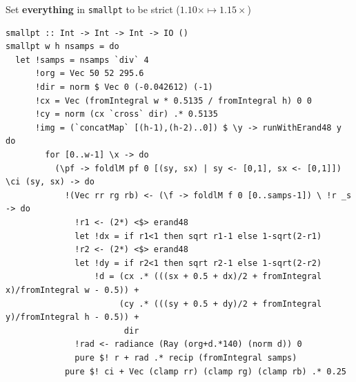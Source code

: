 \documentclass[8pt]{beamer}
\begin{document}
\begin{frame}[fragile]{Set \textbf{everything} in \texttt{smallpt} to be strict ($1.10\times \mapsto  1.15\times$)}
\begin{verbatim}
smallpt :: Int -> Int -> Int -> IO ()
smallpt w h nsamps = do
  let !samps = nsamps `div` 4
      !org = Vec 50 52 295.6
      !dir = norm $ Vec 0 (-0.042612) (-1)
      !cx = Vec (fromIntegral w * 0.5135 / fromIntegral h) 0 0
      !cy = norm (cx `cross` dir) .* 0.5135
      !img = (`concatMap` [(h-1),(h-2)..0]) $ \y -> runWithErand48 y do
        for [0..w-1] \x -> do
          (\pf -> foldlM pf 0 [(sy, sx) | sy <- [0,1], sx <- [0,1]]) \ci (sy, sx) -> do
            !(Vec rr rg rb) <- (\f -> foldlM f 0 [0..samps-1]) \ !r _s -> do
              !r1 <- (2*) <$> erand48
              let !dx = if r1<1 then sqrt r1-1 else 1-sqrt(2-r1)
              !r2 <- (2*) <$> erand48
              let !dy = if r2<1 then sqrt r2-1 else 1-sqrt(2-r2)
                  !d = (cx .* (((sx + 0.5 + dx)/2 + fromIntegral x)/fromIntegral w - 0.5)) +
                       (cy .* (((sy + 0.5 + dy)/2 + fromIntegral y)/fromIntegral h - 0.5)) + 
                        dir
              !rad <- radiance (Ray (org+d.*140) (norm d)) 0
              pure $! r + rad .* recip (fromIntegral samps)
            pure $! ci + Vec (clamp rr) (clamp rg) (clamp rb) .* 0.25
\end{verbatim}


\end{frame}


\end{document}
